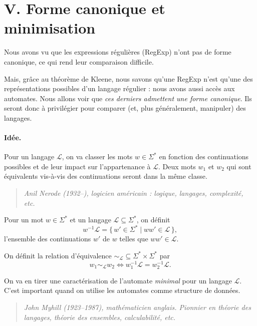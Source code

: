 \section*{V. Forme canonique et minimisation}

Nous avons vu que les expressions régulières (RegExp) n'ont pas de forme canonique, ce qui rend leur comparaison difficile.

Mais, grâce au théorème de Kleene, nous savons qu'une RegExp n'est qu'une des représentations possibles d'un langage régulier : nous avons aussi accès aux automates. Nous allons voir que \emph{ces derniers admettent une forme canonique}. Ils seront donc à privilégier pour comparer (et, plus généralement, manipuler) des langages.

\paragraph{Idée.}
Pour un langage $\mathcal{L}$, on va classer les mots $w \in \Sigma^*$ en fonction des continuations possibles et de leur impact sur l'appartenance à $\mathcal{L}$. Deux mots $w_1$ et $w_2$ qui sont équivalents vis-à-vis des continuations seront dans la même classe.

\begin{quote}
\small\itshape
Anil Nerode (1932--), logicien américain : logique, langages, complexité, etc.
\end{quote}

\begin{definition}
Pour un mot $w \in \Sigma^*$ et un langage $\mathcal{L} \subseteq \Sigma^*$, on définit
\[
w^{-1}\mathcal{L} = \{\, w' \in \Sigma^* \mid ww' \in \mathcal{L} \,\},
\]
l'ensemble des continuations $w'$ de $w$ telles que $ww' \in \mathcal{L}$.

On définit la relation d'équivalence ${\sim_{\mathcal{L}}} \subseteq \Sigma^* \times \Sigma^*$ par
\[
w_1 \sim_{\mathcal{L}} w_2 \iff w_1^{-1}\mathcal{L} = w_2^{-1}\mathcal{L}.
\]
\end{definition}


On va en tirer une caractérisation de l'automate \emph{minimal} pour un langage $\mathcal{L}$. C'est important quand on utilise les automates comme structure de données.

\begin{quote}
\small\itshape
John Myhill (1923--1987), mathématicien anglais. Pionnier en théorie des langages, théorie des ensembles, calculabilité, etc.
\end{quote}

